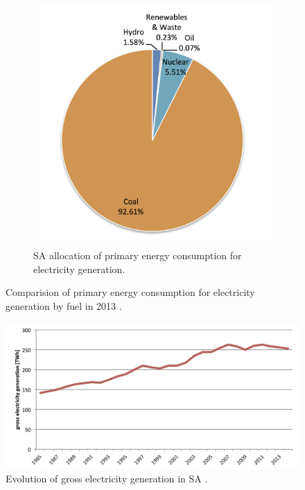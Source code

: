 \begin{figure}[!htbp]
\begin{subfigure}[b]{0.45\textwidth}
                \includegraphics[width=1\textwidth]{FIG/ElectrSA}
                \caption{SA allocation of primary energy consumption for electricity generation.}\label{ElectrSA}
        \end{subfigure}
\caption[Comparision of primary energy consumption for electricity generation by fuel in 2013.]{Comparision of primary energy consumption for electricity generation by fuel in 2013 \cite{Agency2015}.}\label{Electr}
\end{figure}


\begin{figure}[htbp]  
\centering
\includegraphics[width=1\linewidth]{FIG/electrGross}
\caption[Evolution of gross electricity generation in SA.]{Evolution of gross electricity generation in SA \cite{BP2015c}.}\label{electrGross}
\end{figure}

